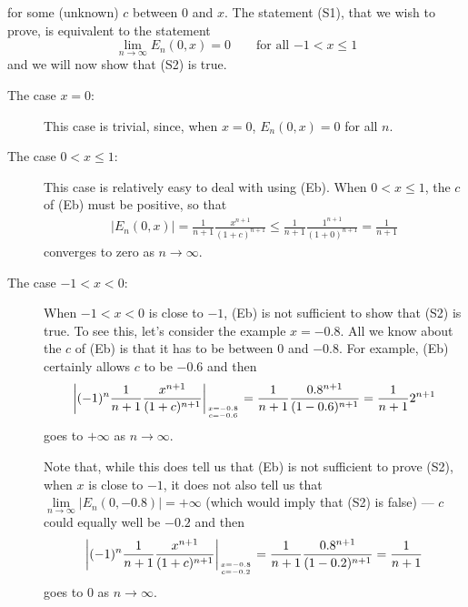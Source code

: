 \begin{eg}
for some (unknown) $c$ between $0$ and $x$. The statement (S1), that we wish to prove, is equivalent to the statement
\begin{equation*}
\lim_{n\rightarrow\infty} E_n(0,x)=0 \qquad\text{for all $-1<x\le 1$} 
\tag{S2}\end{equation*}
and we will now show that (S2) is true.
\begin{description}
\item[The case $x=0$:] 
This case is trivial, since, when $x=0$, $E_n(0,x)=0$ for all $n$. 
\item[The case $0< x\le 1$:] 
This case is relatively easy to deal with using (Eb). When $0< x\le 1$,
the $c$ of (Eb) must be positive, so that
\begin{align*}
\left|E_n(0,x)\right| = \frac{1}{n+1}\frac{x^{n+1}}{(1+c)^{n+1}}
\le \frac{1}{n+1}\frac{1^{n+1}}{(1+0)^{n+1}} =\frac{1}{n+1}
\end{align*}
converges to zero as $n\rightarrow\infty$.


\item[The case $-1<x<0$:] When $-1<x<0$ is close to $-1$, (Eb) is not 
sufficient to show that (S2) is true. To see this, let's consider the 
example $x=-0.8$. All we know about the $c$ of (Eb) is that it has to be
between $0$ and $-0.8$. For example, (Eb) certainly allows $c$ to be $-0.6$ 
and then
\begin{align*}
\left|(-1)^n\frac{1}{n+1}\frac{x^{n+1}}{(1+c)^{n+1}}
       \right|_{\genfrac{}{}{0pt}{}{x=-0.8}{c=-0.6}}
=\frac{1}{n+1}\frac{0.8^{n+1}}{(1-0.6)^{n+1}}
=\frac{1}{n+1}2^{n+1}
\end{align*}   
goes to $+\infty$ as $n\rightarrow\infty$. 

Note that, while this does tell us
that (Eb) is not sufficient to prove (S2), when $x$ is close to $-1$, it does not also tell us that $\lim\limits_{n\rightarrow\infty}|E_n(0,-0.8)|=+\infty$ (which would imply that (S2) is false)  --- $c$ could equally well be $-0.2$ 
and then 
\begin{align*}
\left|(-1)^n\frac{1}{n+1}\frac{x^{n+1}}{(1+c)^{n+1}}
       \right|_{\genfrac{}{}{0pt}{}{x=-0.8}{c=-0.2}}
=\frac{1}{n+1}\frac{0.8^{n+1}}{(1-0.2)^{n+1}}
=\frac{1}{n+1}
\end{align*}   
goes to $0$ as $n\rightarrow\infty$.


\end{description}
\end{eg}
